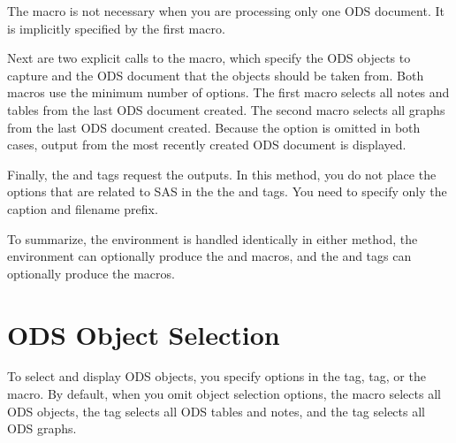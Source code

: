 \documentclass[article,oneside]{memoir}
\begin{document}
  The  macro is not necessary when you are processing
  only one ODS document. It is implicitly specified by the first  macro.

  Next are two explicit calls to the  macro, which
  specify the ODS objects to capture and the ODS document that the objects
  should be taken from.
  Both  macros use the minimum number of options.
  The first  macro selects all
  notes and tables from the last ODS document created. The second  macro
  selects all graphs from the last ODS document created.
  Because the  option is omitted in both cases,
  output from the most recently created ODS document is displayed.

  Finally, the  and  tags request the outputs.
  In
  this method, you do not place the options that are related to SAS in the
  the  and  tags. You need to
  specify only the caption and filename prefix.


  To summarize, the  environment is handled identically in either method,
  the  environment can optionally produce the  and  macros,
  and the  and  tags can optionally produce the  macros.


 \section{ODS Object Selection}\label{selection}
To select and display ODS objects, you specify options in the  tag, 
  tag, or the  macro.
\label{optionopt}
By default, when you omit object selection options, the  macro selects all ODS objects,
the  tag selects all ODS tables and notes, and the  tag selects all ODS graphs.
\end{document}
